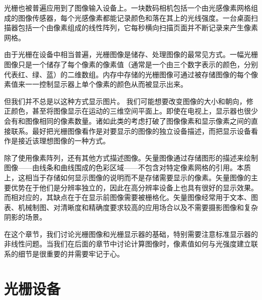 \documentclass[lang=cn,12pt,marginpar=margintrue]{elegantbook}
\begin{document}
光栅也被普遍应用到了图像输入设备上。一块数码相机包括一个由光感像素网格组成的图像传感器，每个光感像素都能记录颜色和落在其上的光线强度。一台桌面扫描器包括一个由像素组成的线性阵列，它每秒横向扫描页面并不断记录来产生像素网格。

由于光栅在设备中相当普遍，光栅图像是储存、处理图像的最常见方式。一幅光栅图像只是一个储存了每个像素的像素值（通常是一个由三个数字表示的颜色，分别代表红、绿、蓝）的二维数组。内存中存储的光栅图像可通过被存储图像的每个像素值来一一控制显示器上单个像素的颜色从而被显示出来。


但我们并不总是以这种方式显示图片。 我们可能想要改变图像的大小和朝向，修正颜色，甚至将图像显示在运动的三维空间平面上。即使在电视上，显示器也很少会有和图像相同的像素数量。诸如此类的考虑打破了图像像素和显示像素之间的直接联系。最好把光栅图像看作是对要显示的图像的独立设备描述，而把显示设备看作是接近该理想图像的一种方式。

除了使用像素阵列，还有其他方式描述图像。矢量图像通过存储图形的描述来绘制图像——由线条和曲线围成的色彩区域——不包含对特定像素网格的引用。本质上，这相当于存储如何显示图像的说明而不是存储需要显示的像素。矢量图像的主要优势在于他们是分辨率独立的，因此在高分辨率设备上也具有很好的显示效果。而相对应的，其缺点在于在显示前图像需要被栅格化。矢量图像经常用于文本、图表、机械制图、对清晰度和精确度要求较高的应用场合以及不需要摄影图像和复杂阴影的场景。

在这个章节，我们讨论光栅图像和光栅显示器的基础，特别需要注意标准显示器的非线性问题。当我们在后面的章节中讨论计算图像时，像素值如何与光强度建立联系的细节是很重要的并需要牢记于心。


\section{光栅设备}
\end{document}
